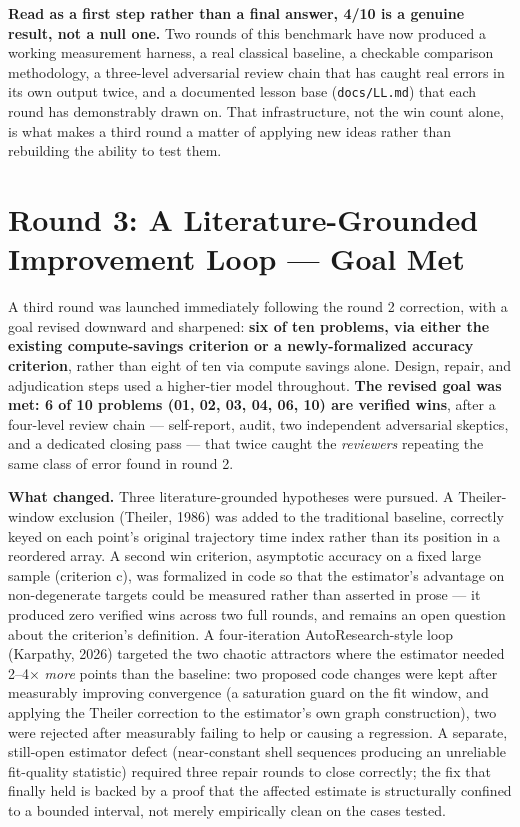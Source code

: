 \documentclass[11pt,a4paper]{article}
\begin{document}
\textbf{Read as a first step rather than a final answer, 4/10 is a genuine
result, not a null one.} Two rounds of this benchmark have now produced a
working measurement harness, a real classical baseline, a checkable
comparison methodology, a three-level adversarial review chain that has
caught real errors in its own output twice, and a documented lesson base
(\texttt{docs/LL.md}) that each round has demonstrably drawn on. That
infrastructure, not the win count alone, is what makes a third round a
matter of applying new ideas rather than rebuilding the ability to test
them.

\section{Round 3: A Literature-Grounded Improvement Loop --- Goal Met}
\label{sec:round3}

A third round was launched immediately following the round 2 correction,
with a goal revised downward and sharpened: \textbf{six of ten problems,
via either the existing compute-savings criterion or a newly-formalized
accuracy criterion}, rather than eight of ten via compute savings alone.
Design, repair, and adjudication steps used a higher-tier model throughout.
\textbf{The revised goal was met: 6 of 10 problems (01, 02, 03, 04, 06, 10)
are verified wins}, after a four-level review chain --- self-report, audit,
two independent adversarial skeptics, and a dedicated closing pass --- that
twice caught the \emph{reviewers} repeating the same class of error found
in round 2.

\textbf{What changed.} Three literature-grounded hypotheses were pursued.
A Theiler-window exclusion (Theiler, 1986) was added to the traditional
baseline, correctly keyed on each point's original trajectory time index
rather than its position in a reordered array. A second win criterion,
asymptotic accuracy on a fixed large sample (criterion c), was formalized
in code so that the estimator's advantage on non-degenerate targets could
be measured rather than asserted in prose --- it produced zero verified
wins across two full rounds, and remains an open question about the
criterion's definition. A four-iteration AutoResearch-style loop (Karpathy,
2026) targeted the two chaotic attractors where the estimator needed
2--4$\times$ \emph{more} points than the baseline: two proposed code
changes were kept after measurably improving convergence (a saturation
guard on the fit window, and applying the Theiler correction to the
estimator's own graph construction), two were rejected after measurably
failing to help or causing a regression. A separate, still-open estimator
defect (near-constant shell sequences producing an unreliable fit-quality
statistic) required three repair rounds to close correctly; the fix that
finally held is backed by a proof that the affected estimate is
structurally confined to a bounded interval, not merely empirically clean
on the cases tested.
\end{document}
